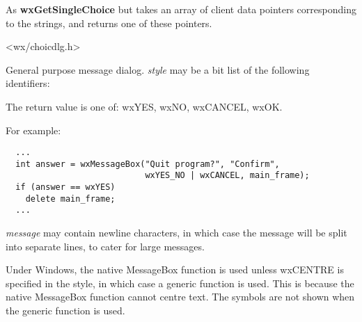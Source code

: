 As {\bf wxGetSingleChoice} but takes an array of client data pointers
corresponding to the strings, and returns one of these pointers.


<wx/choicdlg.h>

\label{wxmessagebox}


General purpose message dialog.  {\it style} may be a bit list of the
following identifiers:

\begin{twocollist}\itemsep=0pt
\end{twocollist}

The return value is one of: wxYES, wxNO, wxCANCEL, wxOK.

For example:

\begin{verbatim}
  ...
  int answer = wxMessageBox("Quit program?", "Confirm",
                            wxYES_NO | wxCANCEL, main_frame);
  if (answer == wxYES)
    delete main_frame;
  ...
\end{verbatim}

{\it message} may contain newline characters, in which case the
message will be split into separate lines, to cater for large messages.

Under Windows, the native MessageBox function is used unless wxCENTRE
is specified in the style, in which case a generic function is used.
This is because the native MessageBox function cannot centre text.
The symbols are not shown when the generic function is used.


